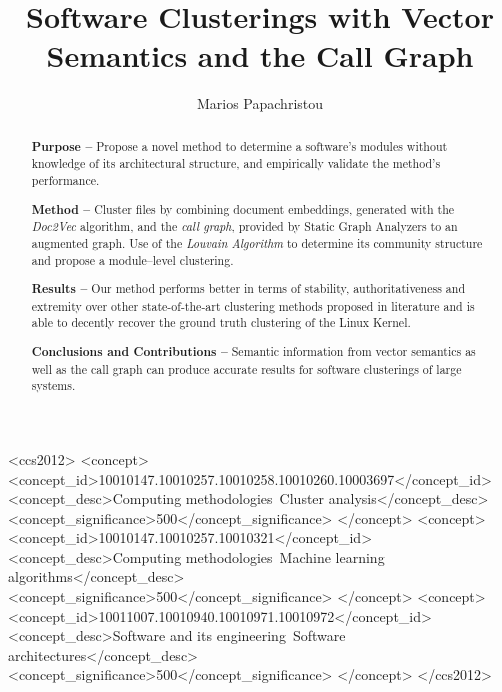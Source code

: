 \documentclass[sigconf,review, anonymous]{acmart}
\begin{document}
%
\title{Software Clusterings with Vector Semantics and 
the Call Graph}

%
\author{Marios Papachristou}


\renewcommand{\shortauthors}{Papachristou}

\begin{abstract}

\noindent \textbf{Purpose -- } Propose a novel method to determine a software's modules without 
knowledge of its architectural structure, and empirically validate the method's performance.

\noindent \textbf{Method -- } Cluster files by combining document embeddings, generated with the  \emph{Doc2Vec} algorithm, and the \emph{call graph}, provided by Static Graph Analyzers to an augmented graph.
Use of the \emph{Louvain Algorithm} to determine its community structure and propose a module--level clustering. 


\noindent \textbf{Results --} Our method performs better in terms of stability, authoritativeness 
and extremity over other state-of-the-art clustering methods proposed in literature and is able to decently 
recover the ground truth clustering of the Linux Kernel. 

\noindent \textbf{Conclusions and Contributions --} Semantic information from vector semantics as well as the call graph can produce 
accurate results for software clusterings of large systems.

\end{abstract}

%
%
\begin{CCSXML}
<ccs2012>
<concept>
<concept_id>10010147.10010257.10010258.10010260.10003697</concept_id>
<concept_desc>Computing methodologies~Cluster analysis</concept_desc>
<concept_significance>500</concept_significance>
</concept>
<concept>
<concept_id>10010147.10010257.10010321</concept_id>
<concept_desc>Computing methodologies~Machine learning algorithms</concept_desc>
<concept_significance>500</concept_significance>
</concept>
<concept>
<concept_id>10011007.10010940.10010971.10010972</concept_id>
<concept_desc>Software and its engineering~Software architectures</concept_desc>
<concept_significance>500</concept_significance>
</concept>
</ccs2012>
\end{CCSXML}
\end{document}
